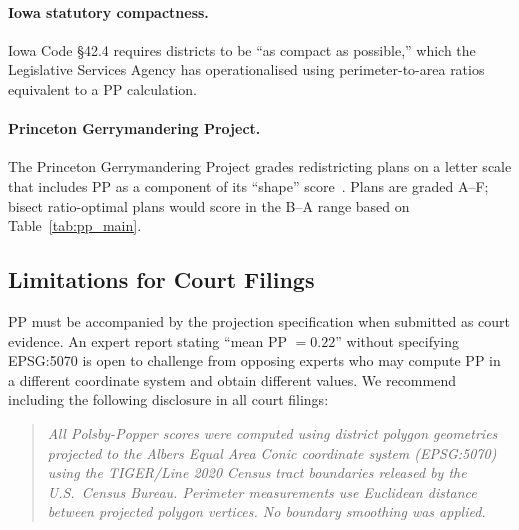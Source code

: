 \paragraph{Iowa statutory compactness.}
Iowa Code \S 42.4 requires districts to be ``as compact as possible,''
which the Legislative Services Agency has operationalised using perimeter-to-area
ratios equivalent to a PP calculation.

\paragraph{Princeton Gerrymandering Project.}
The Princeton Gerrymandering Project grades redistricting plans on a letter
scale that includes PP as a component of its ``shape'' score~\citep{pgp2022}.
Plans are graded A--F; bisect ratio-optimal plans would score in the B--A range
based on Table~\ref{tab:pp_main}.

\subsection{Limitations for Court Filings}

PP must be accompanied by the projection specification when submitted as
court evidence. An expert report stating ``mean PP $= 0.22$'' without specifying
EPSG:5070 is open to challenge from opposing experts who may compute PP in
a different coordinate system and obtain different values.
We recommend including the following disclosure in all court filings:
\begin{quote}
  \emph{All Polsby-Popper scores were computed using district polygon geometries
  projected to the Albers Equal Area Conic coordinate system (EPSG:5070) using
  the TIGER/Line 2020 Census tract boundaries released by the U.S.\ Census Bureau.
  Perimeter measurements use Euclidean distance between projected polygon vertices.
  No boundary smoothing was applied.}
\end{quote}
